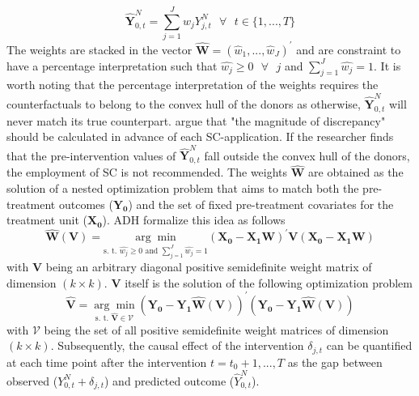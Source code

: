 \[
\widehat{\boldsymbol{Y}}^{N}_{0,t} = \sum_{j = 1}^{J} \widehat{w}_j Y^{N}_{j,t} \text{ } \forall \text{ } t \in \{1,...,T\}
\]
The weights are stacked in the vector $\boldsymbol{\widehat{W}} = (\widehat{w}_1, ... , \widehat{w}_J)^\prime$ and are constraint to have a percentage interpretation such that $\widehat{w_j} \geq 0 \text{ } \forall \text{ } j$ and $\sum_{j = 1}^{J} \widehat{w_j} = 1$. It is worth noting that the percentage interpretation of the weights requires the counterfactuals to belong to the convex hull of the donors as otherwise, $\widehat{\boldsymbol{Y}}^{N}_{0,t}$ will never match its true counterpart. \cite{abadie:2010} argue that "the magnitude of discrepancy" should be calculated in advance of each \ac{SC}-application. If the researcher finds that the pre-intervention values of $\widehat{\boldsymbol{Y}}^{N}_{0,t}$ fall outside the convex hull of the donors, the employment of \ac{SC} is not recommended. The weights $\boldsymbol{\widehat{W}}$ are obtained as the solution of a nested optimization problem that aims to match both the pre-treatment outcomes ($\boldsymbol{Y_0}$) and the set of fixed pre-treatment covariates for the treatment unit ($\boldsymbol{X_0}$). \ac{ADH} formalize this idea as follows
\[
\widehat{\boldsymbol{W}}(\boldsymbol{V}) = 
\underset{\text{s. t. }\widehat{w_j} \geq 0 \text{ and } \sum_{j = 1}^{J} \widehat{w_j} = 1}{\arg\min}
(\boldsymbol{X_0} - \boldsymbol{X_1}\boldsymbol{W})^\prime \boldsymbol{V}(\boldsymbol{X_0} - \boldsymbol{X_1}\boldsymbol{W})
\]
with $\boldsymbol{V}$ being an arbitrary diagonal positive semidefinite weight matrix of dimension $(k \times k)$. $\boldsymbol{V}$ itself is the solution of the following optimization problem
\[
\widehat{\boldsymbol{V}} = 
\underset{\text{s. t. } \widehat{\boldsymbol{V}} \in \mathcal{V}}{\arg\min}
(\boldsymbol{Y_0} - \boldsymbol{Y_1}\boldsymbol{\widehat{W}}(\boldsymbol{V}))^\prime (\boldsymbol{Y_0} - \boldsymbol{Y_1} \boldsymbol{\widehat{W}}(\boldsymbol{V}))
\]
with $\mathcal{V}$ being the set of all positive semidefinite weight matrices of dimension $(k \times k)$. Subsequently, the causal effect of the intervention $\delta_{j,t}$ can be quantified at each time point after the intervention $t = t_0 +1, ..., T$ as the gap between observed ($Y^{N}_{0,t} + \delta_{j,t}$) and predicted outcome ($\widehat{Y}^{N}_{0,t}$).

